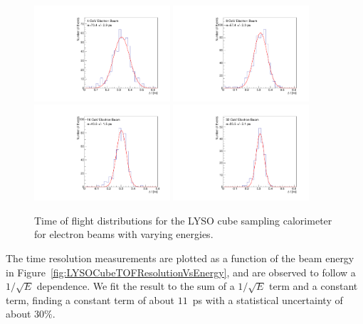 \documentclass[12pt]{article}
\begin{document}
\begin{figure}[H] \centering
\includegraphics[width=0.45\textwidth]{figs/TOF_Electron_LYSOCube_4GeV} 
\includegraphics[width=0.45\textwidth]{figs/TOF_Electron_LYSOCube_8GeV} 
\includegraphics[width=0.45\textwidth]{figs/TOF_Electron_LYSOCube_16GeV} 
\includegraphics[width=0.45\textwidth]{figs/TOF_Electron_LYSOCube_32GeV} 
\caption{ Time of flight distributions for the LYSO cube sampling calorimeter
for electron beams with varying energies. } 
\label{fig:LYSOCubeTOF}
\end{figure}

The time resolution measurements are plotted as a function of the
beam energy in Figure~\ref{fig:LYSOCubeTOFResolutionVsEnergy}, and are observed
to follow a $1/\sqrt{E}$ dependence. We fit the result to the sum of a 
$1/\sqrt{E}$ term and a constant term, finding a constant term of
about $11$~ps with a statistical uncertainty of about $30\%$. 
\end{document}
